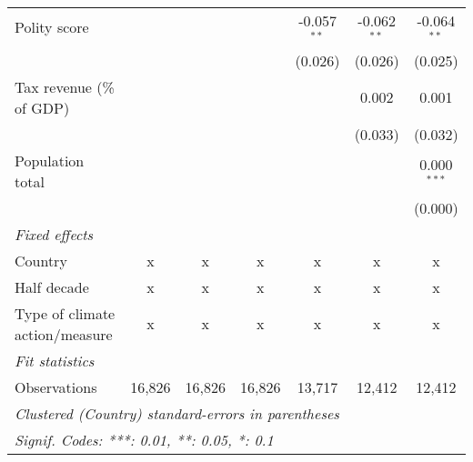 \begin{tabular}{lcccccc}
   Polity score                                                        &         &             &             & -0.057$^{**}$ & -0.062$^{**}$ & -0.064$^{**}$\\   
                                                                       &         &             &             & (0.026)       & (0.026)       & (0.025)\\   
   Tax revenue (\% of GDP)                                             &         &             &             &               & 0.002         & 0.001\\   
                                                                       &         &             &             &               & (0.033)       & (0.032)\\   
   Population total                                                    &         &             &             &               &               & 0.000$^{***}$\\   
                                                                       &         &             &             &               &               & (0.000)\\   
   \emph{Fixed effects}\\
   Country                                                             & x       & x           & x           & x             & x             & x\\  
   Half decade                                                         & x       & x           & x           & x             & x             & x\\  
   Type of climate action/measure                                      & x       & x           & x           & x             & x             & x\\  
   \midrule \emph{Fit statistics}\\
   Observations                                                        & 16,826  & 16,826      & 16,826      & 13,717        & 12,412        & 12,412\\  
   \midrule
   \multicolumn{7}{l}{\emph{Clustered (Country) standard-errors in parentheses}}\\
   \multicolumn{7}{l}{\emph{Signif. Codes: ***: 0.01, **: 0.05, *: 0.1}}\\
\end{tabular}
\par\endgroup



